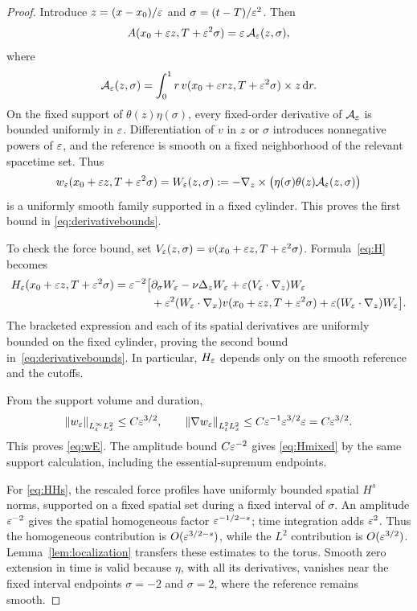 \begin{proof}
Introduce $z=(x-x_0)/\varepsilon$ and $\sigma=(t-T)/\varepsilon^2$. Then
\[
 A(x_0+\varepsilon z,T+\varepsilon^2\sigma)=\varepsilon\,\mathcal A_\varepsilon(z,\sigma),
\]
where
\[
 \mathcal A_\varepsilon(z,\sigma)
 =\int_0^1r\,v(x_0+\varepsilon rz,T+\varepsilon^2\sigma)\times z\,\mathrm d r.
\]
On the fixed support of $\theta(z)\eta(\sigma)$, every fixed-order derivative of $\mathcal A_\varepsilon$ is bounded uniformly in $\varepsilon$. Differentiation of $v$ in $z$ or $\sigma$ introduces nonnegative powers of $\varepsilon$, and the reference is smooth on a fixed neighborhood of the relevant spacetime set. Thus
\[
 w_\varepsilon(x_0+\varepsilon z,T+\varepsilon^2\sigma)
 =W_\varepsilon(z,\sigma)
 :=-\nabla_z\times\bigl(\eta(\sigma)\theta(z)\mathcal A_\varepsilon(z,\sigma)\bigr)
\]
is a uniformly smooth family supported in a fixed cylinder. This proves the first bound in \eqref{eq:derivativebounds}.

To check the force bound, set
$V_\varepsilon(z,\sigma)=v(x_0+\varepsilon z,T+\varepsilon^2\sigma)$.
Formula~\eqref{eq:H} becomes
\begin{align*}
 H_\varepsilon(x_0+\varepsilon z,T+\varepsilon^2\sigma)
 =\varepsilon^{-2}\bigl[&
 \partial_\sigma W_\varepsilon-\nu\Delta_zW_\varepsilon
 +\varepsilon(V_\varepsilon\cdot\nabla_z)W_\varepsilon\\
 &+\varepsilon^2(W_\varepsilon\cdot\nabla_x)v(x_0+\varepsilon z,T+\varepsilon^2\sigma)
 +\varepsilon(W_\varepsilon\cdot\nabla_z)W_\varepsilon\bigr].
\end{align*}
The bracketed expression and each of its spatial derivatives are uniformly bounded on the fixed cylinder, proving the second bound in~\eqref{eq:derivativebounds}. In particular, $H_\varepsilon$ depends only on the smooth reference and the cutoffs.

From the support volume and duration,
\[
 \left\lVert w_\varepsilon\right\rVert_{L^\infty_tL^2_x}\le C\varepsilon^{3/2},\qquad
 \left\lVert\nabla w_\varepsilon\right\rVert_{L^2_tL^2_x}
 \le C\varepsilon^{-1}\varepsilon^{3/2}\varepsilon=C\varepsilon^{3/2}.
\]
This proves \eqref{eq:wE}. The amplitude bound $C\varepsilon^{-2}$ gives
\eqref{eq:Hmixed} by the same support calculation, including the essential-supremum endpoints.

For \eqref{eq:HHs}, the rescaled force profiles have uniformly bounded spatial $H^s$ norms, supported on a fixed spatial set during a fixed interval of $\sigma$. An amplitude $\varepsilon^{-2}$ gives the spatial homogeneous factor $\varepsilon^{-1/2-s}$; time integration adds $\varepsilon^2$. Thus the homogeneous contribution is $O(\varepsilon^{3/2-s})$, while the $L^2$ contribution is $O(\varepsilon^{3/2})$. Lemma~\ref{lem:localization} transfers these estimates to the torus. Smooth zero extension in time is valid because $\eta$, with all its derivatives, vanishes near the fixed interval endpoints $\sigma=-2$ and $\sigma=2$, where the reference remains smooth.
\end{proof}

